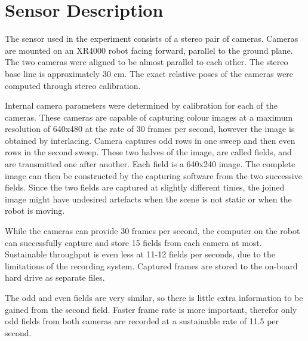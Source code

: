 \section{Sensor Description}

The sensor used in the experiment consists of a stereo pair of
cameras. Cameras are mounted on an XR4000 robot facing forward,
parallel to the ground plane. The two cameras were aligned to be
almost parallel to each other. The stereo base line is approximately 30
cm. The exact relative poses of the cameras were computed through
stereo calibration.

Internal camera parameters were determined by calibration for each of
the cameras. These cameras are capable of capturing colour images at a
maximum resolution of 640x480 at the rate of 30 frames per second,
however the image is obtained by interlacing. Camera captures odd rows
in one sweep and then even rows in the second sweep. These two halves
of the image, are called fields, and are transmitted one after
another. Each field is a 640x240 image. The complete image can then be
constructed by the capturing software from the two successive fields.
Since the two fields are captured at slightly different times, the
joined image might have undesired artefacts when the scene is not
static or when the robot is moving.

While the cameras can provide 30 frames per second, the computer on
the robot can successfully capture and store 15 fields from each
camera at most.  Sustainable throughput is even less at 11-12 fields
per seconds, due to the limitations of the recording system. Captured
frames are stored to the on-board hard drive as separate files.

The odd and even fields are very similar, so there is little extra
information to be gained from the second field. Faster frame rate is
more important, therefor only odd fields from both cameras are
recorded at a sustainable rate of 11.5 per second.


